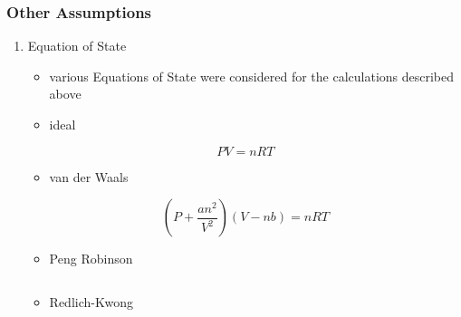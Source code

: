 \documentclass[11pt]{article}
\begin{document}
\subsubsection{Other Assumptions}
\label{sec:org03bfc71}
\begin{enumerate}
\item Equation of State
\label{sec:org9940fec}
\begin{itemize}
\item various Equations of State were considered for the calculations described above
\item ideal
\end{itemize}
\begin{equation}
PV = nRT
\end{equation}
\begin{itemize}
\item van der Waals
\end{itemize}
\begin{equation}
(P + \frac{an^2}{V^2})(V-nb) = nRT
\end{equation}
\begin{itemize}
\item Peng Robinson
\end{itemize}
\begin{equation}

\end{equation}
\begin{itemize}
\item Redlich-Kwong
\end{itemize}
\begin{equation}


\end{equation}
\end{enumerate}
\end{document}
